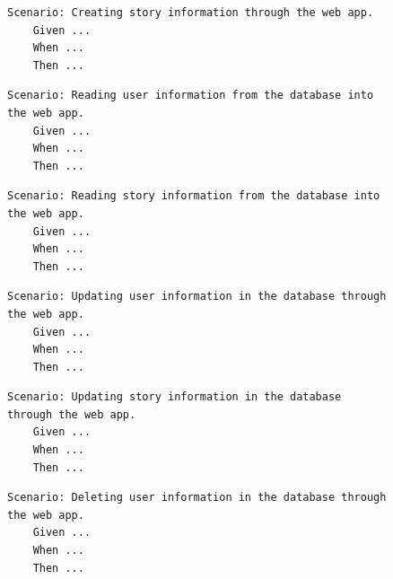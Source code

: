 \begin{figure}[!htbp]
    \centering
    \begin{verbatim}
Scenario: Creating story information through the web app.
    Given ...
    When ...
    Then ...
    \end{verbatim}
    \label{fig:create-story-data}
\end{figure}

\begin{figure}[!htbp]
    \centering
    \begin{verbatim}
Scenario: Reading user information from the database into the web app.
    Given ...
    When ...
    Then ...
    \end{verbatim}
    \label{fig:read-user-data}
\end{figure}

\begin{figure}[!htbp]
    \centering
    \begin{verbatim}
Scenario: Reading story information from the database into the web app.
    Given ...
    When ...
    Then ...
    \end{verbatim}
    \label{fig:read-story-data}
\end{figure}

\begin{figure}[!htbp]
    \centering
    \begin{verbatim}
Scenario: Updating user information in the database through the web app.
    Given ...
    When ...
    Then ...
    \end{verbatim}
    \label{fig:update-user-data}
\end{figure}

\begin{figure}[!htbp]
    \centering
    \begin{verbatim}
Scenario: Updating story information in the database through the web app.
    Given ...
    When ...
    Then ...
    \end{verbatim}
    \label{fig:update-story-data}
\end{figure}

\begin{figure}[!htbp]
    \centering
    \begin{verbatim}
Scenario: Deleting user information in the database through the web app.
    Given ...
    When ...
    Then ...
    \end{verbatim}
    \label{fig:delete-user-data}
\end{figure}

